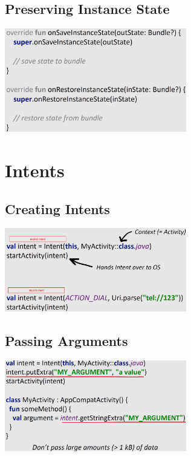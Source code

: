 \documentclass{report}
\newenvironment{Figure}
	{\par\medskip\noindent\minipage{\linewidth}}
	{\endminipage\par\medskip}
\theoremstyle{definition}
\theoremstyle{example}
\begin{document}
\subsection{Preserving Instance State}
\begin{Figure}
   \centering
    \includegraphics[width=300px]{img/PreservingInstanceState.png}
        \label{fig:Code Snippet Preserving Instance State}
\end{Figure}

\section{Intents}
\subsection{Creating Intents}
\begin{Figure}
   \centering
    \includegraphics[width=300px]{img/creatingIntents.png}
        \label{fig:Code Snippet Creating explicit and implicit intents}
\end{Figure}

\subsection{Passing Arguments}
\begin{Figure}
   \centering
    \includegraphics[width=300px]{img/PassingArguments.png}
        \label{fig:Code Snippet passing arguments}
\end{Figure}
\end{document}
